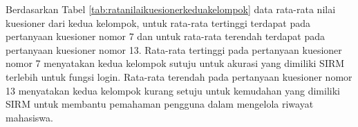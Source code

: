 Berdasarkan Tabel \ref{tab:ratanilaikuesionerkeduakelompok} data rata-rata nilai
kuesioner dari kedua kelompok, untuk rata-rata tertinggi terdapat pada
pertanyaan kuesioner nomor 7 dan untuk rata-rata terendah terdapat pada
pertanyaan kuesioner nomor 13. Rata-rata tertinggi pada pertanyaan kuesioner
nomor 7 menyatakan kedua kelompok sutuju untuk akurasi yang dimiliki SIRM
terlebih untuk fungsi login. Rata-rata terendah pada pertanyaan kuesioner nomor
13 menyatakan kedua kelompok kurang setuju untuk kemudahan yang dimiliki SIRM
untuk membantu pemahaman pengguna dalam mengelola riwayat mahasiswa.